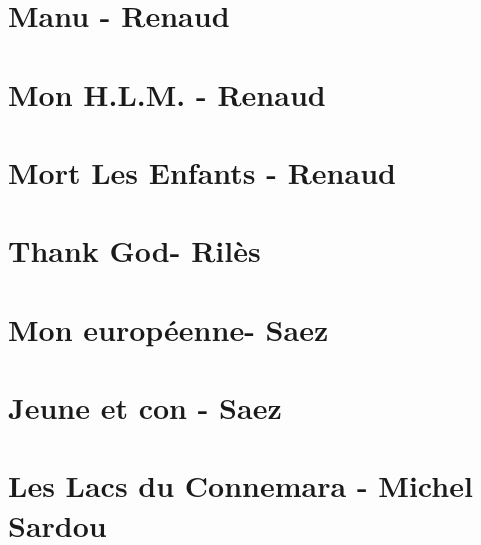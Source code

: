 \documentclass{guitartabs}
\begin{document}
\section{Manu - Renaud}
\begin{guitar}

\end{guitar}

\section*{Mon H.L.M. - Renaud}
\begin{guitar}

\end{guitar}

\section{Mort Les Enfants - Renaud}
\begin{guitar}

\end{guitar}

\section{Thank God- Rilès}
\begin{guitar}

\end{guitar}

\section{Mon européenne- Saez}
\begin{guitar}

\end{guitar}


\section{Jeune et con - Saez}
\begin{guitar}

\end{guitar}

\section{Les Lacs du Connemara - Michel Sardou}
\begin{guitar}

\end{guitar}
\end{document}
